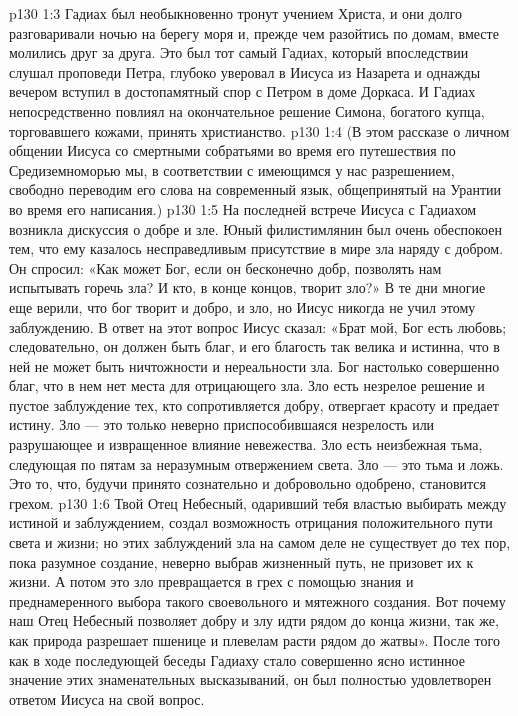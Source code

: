 \vs p130 1:3 Гадиах был необыкновенно тронут учением Христа, и они долго разговаривали ночью на берегу моря и, прежде чем разойтись по домам, вместе молились друг за друга. Это был тот самый Гадиах, который впоследствии слушал проповеди Петра, глубоко уверовал в Иисуса из Назарета и однажды вечером вступил в достопамятный спор с Петром в доме Доркаса. И Гадиах непосредственно повлиял на окончательное решение Симона, богатого купца, торговавшего кожами, принять христианство.
\vs p130 1:4 \pc (В этом рассказе о личном общении Иисуса со смертными собратьями во время его путешествия по Средиземноморью мы, в соответствии с имеющимся у нас разрешением, свободно переводим его слова на современный язык, общепринятый на Урантии во время его написания.)
\vs p130 1:5 \pc На последней встрече Иисуса с Гадиахом возникла дискуссия о добре и зле. Юный филистимлянин был очень обеспокоен тем, что ему казалось несправедливым присутствие в мире зла наряду с добром. Он спросил: «Как может Бог, если он бесконечно добр, позволять нам испытывать горечь зла? И кто, в конце концов, творит зло?» В те дни многие еще верили, что бог творит и добро, и зло, но Иисус никогда не учил этому заблуждению. В ответ на этот вопрос Иисус сказал: «Брат мой, Бог есть любовь; следовательно, он должен быть благ, и его благость так велика и истинна, что в ней не может быть ничтожности и нереальности зла. Бог настолько совершенно благ, что в нем нет места для отрицающего зла. Зло есть незрелое решение и пустое заблуждение тех, кто сопротивляется добру, отвергает красоту и предает истину. Зло --- это только неверно приспособившаяся незрелость или разрушающее и извращенное влияние невежества. Зло есть неизбежная тьма, следующая по пятам за неразумным отвержением света. Зло --- это тьма и ложь. Это то, что, будучи принято сознательно и добровольно одобрено, становится грехом.
\vs p130 1:6 Твой Отец Небесный, одаривший тебя властью выбирать между истиной и заблуждением, создал возможность отрицания положительного пути света и жизни; но этих заблуждений зла на самом деле не существует до тех пор, пока разумное создание, неверно выбрав жизненный путь, не призовет их к жизни. А потом это зло превращается в грех с помощью знания и преднамеренного выбора такого своевольного и мятежного создания. Вот почему наш Отец Небесный позволяет добру и злу идти рядом до конца жизни, так же, как природа разрешает пшенице и плевелам расти рядом до жатвы». После того как в ходе последующей беседы Гадиаху стало совершенно ясно истинное значение этих знаменательных высказываний, он был полностью удовлетворен ответом Иисуса на свой вопрос.
